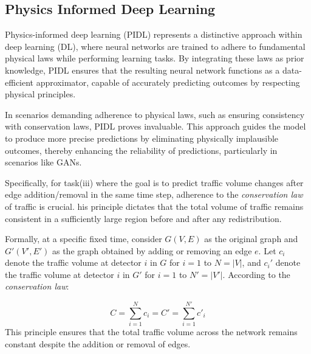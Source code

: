 \subsection{\textbf{Physics Informed Deep Learning}}

Physics-informed deep learning (PIDL) represents a distinctive approach within deep learning (DL), where neural networks are trained to adhere to fundamental physical laws while performing learning tasks. By integrating these laws as prior knowledge, PIDL ensures that the resulting neural network functions as a data-efficient approximator, capable of accurately predicting outcomes by respecting physical principles.

In scenarios demanding adherence to physical laws, such as ensuring consistency with conservation laws, PIDL proves invaluable. This approach guides the model to produce more precise predictions by eliminating physically implausible outcomes, thereby enhancing the reliability of predictions, particularly in scenarios like GANs.

Specifically, for task(iii) where the goal is to predict traffic volume changes after edge addition/removal in the same time step, adherence to the \textit{conservation law} of traffic is crucial. his principle dictates that the total volume of traffic remains consistent in a sufficiently large region before and after any redistribution.


Formally, at a specific fixed time, consider \( G(V, E) \) as the original graph and \( G'(V', E') \) as the graph obtained by adding or removing an edge \( e \). Let \( c_i \) denote the traffic volume at detector \( i \) in \( G \) for \( i = 1 \) to \( N = |V| \), and \( c_i' \) denote the traffic volume at detector \( i \) in \( G' \) for \( i = 1 \) to \( N' = |V'| \). According to the \textit{conservation law}:

\begin{equation}
    C = \sum_{i=1}^{N} c_i = C' = \sum_{i=1}^{N'} c'_i \label{eq:cl}
\end{equation}
This principle ensures that the total traffic volume across the network remains constant despite the addition or removal of edges.

